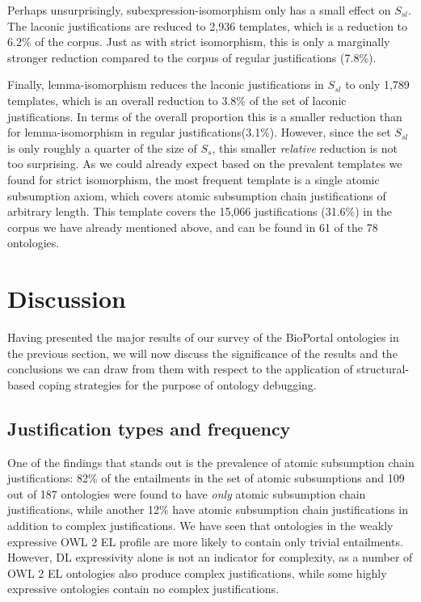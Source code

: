 Perhaps unsurprisingly, subexpression-isomorphism only has a small effect on $S_{sl}$. The laconic justifications are reduced to 2,936 templates, which is a reduction to 6.2\% of the corpus. Just as with strict isomorphism, this is only a marginally stronger reduction compared to the corpus of regular justifications (7.8\%).

Finally, lemma-isomorphism reduces the laconic justifications in $S_{sl}$ to only 1,789 templates, which is an overall reduction to 3.8\% of the set of laconic justifications. In terms of the overall proportion this is a smaller reduction than for lemma-isomorphism in regular justifications(3.1\%). However, since the set $S_{sl}$ is only roughly a quarter of the size of $S_{s}$, this smaller \emph{relative} reduction is not too surprising. As we could already expect based on the prevalent templates we found for strict isomorphism, the most frequent template is a single atomic subsumption axiom, which covers atomic subsumption chain justifications of arbitrary length. This template covers the 15,066 justifications (31.6\%) in the corpus we have already mentioned above, and can be found in 61 of the 78 ontologies.



\section{Discussion}

Having presented the major results of our survey of the BioPortal ontologies in the previous section, we will now discuss the significance of the results and the conclusions we can draw from them with respect to the application of structural-based coping strategies for the purpose of ontology debugging.

\subsection{Justification types and frequency}

One of the findings that stands out is the prevalence of atomic subsumption chain justifications: 82\% of the entailments in the set of atomic subsumptions and 109 out of 187 ontologies were found to have \emph{only} atomic subsumption chain justifications, while another 12\% have atomic subsumption chain justifications in addition to complex justifications. We have seen that ontologies in the weakly expressive OWL 2 EL profile are more likely to contain only trivial entailments. However, DL expressivity alone is not an indicator for complexity, as a number of OWL 2 EL ontologies also produce complex justifications, while some highly expressive ontologies contain no complex justifications.

